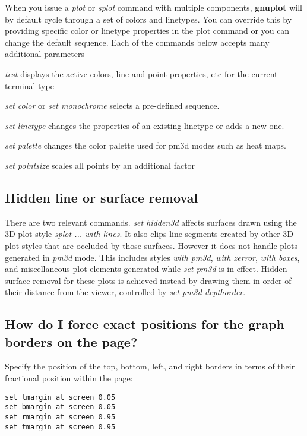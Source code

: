 \documentclass[letter,11pt]{article}
\newcommand{\gnuplot}{\textbf{gnuplot }}
\begin{document}
{When you issue a {\em plot} or {\em splot} command with multiple components,
\gnuplot will by default cycle through a set of colors and linetypes.
You can override this by providing specific color or linetype properties in the
plot command or you can change the default sequence.
Each of the commands below accepts many additional parameters
\begin{list}{}{}
  \item
  {\em test} displays the active colors, line and point properties, etc
             for the current terminal type
  \item
  {\em set color} or {\em set monochrome} selects a pre-defined sequence.
  \item
  {\em set linetype} changes the properties of an existing linetype or adds a new one.
  \item
  {\em set palette} changes the color palette used for pm3d modes such as heat maps.
  \item
  {\em set pointsize} scales all points by an additional factor
\end{list}

\subsection{Hidden line or surface removal}

There are two relevant commands. {\em set hidden3d} affects surfaces
drawn using the 3D plot style {\em splot ... with lines}. It also clips
line segments created by other 3D plot styles that are occluded by those
surfaces.   However it does not handle plots generated in {\em pm3d} mode.
This includes styles {\em with pm3d}, {\em with zerror}, {\em with boxes},
and miscellaneous plot elements generated while {\em set pm3d} is in effect.
Hidden surface removal for these plots is achieved instead by drawing them
in order of their distance from the viewer, controlled by
{\em set pm3d depthorder}.

\subsection{How do I force exact positions for the graph borders on the page?}

Specify the position of the top, bottom, left, and right borders in
terms of their fractional position within the page:

\small
\begin{verbatim}
set lmargin at screen 0.05
set bmargin at screen 0.05
set rmargin at screen 0.95
set tmargin at screen 0.95
\end{verbatim}
\normalsize

}
\end{document}
